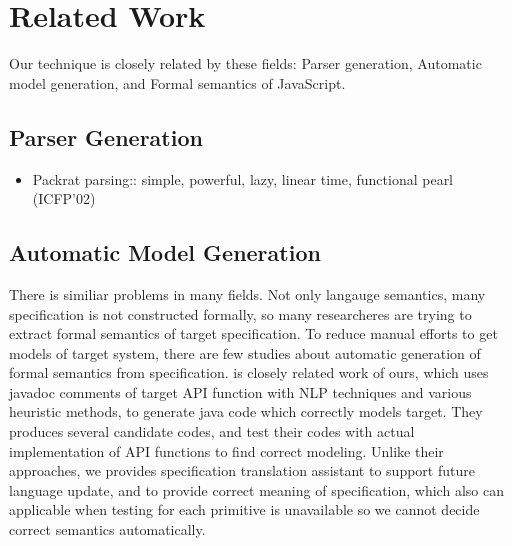 \section{Related Work}

Our technique is closely related by these fields: Parser generation, Automatic model generation, and Formal semantics of JavaScript.
\subsection{Parser Generation}
\begin{itemize}
  \item Packrat parsing:: simple, powerful, lazy, linear time, functional pearl (ICFP'02)~\cite{packrat}
\end{itemize}

\subsection{Automatic Model Generation}
There is similiar problems in many fields. Not only langauge semantics, many specification is not constructed formally, so many researcheres are trying to
extract formal semantics of target specification. To reduce manual efforts to get models of target system, there are few studies about automatic generation of
formal semantics from specification. \cite{javadoc} is closely related work of ours, which uses javadoc comments of target API function with NLP techniques and various
heuristic methods, to generate java code which correctly models target. They produces several candidate codes, and test their codes with actual implementation of API functions
to find correct modeling. Unlike their approaches, we provides specification translation assistant to support future language update, and to provide correct meaning of specification, which also can applicable when
testing for each primitive is unavailable so we cannot decide correct semantics automatically.


